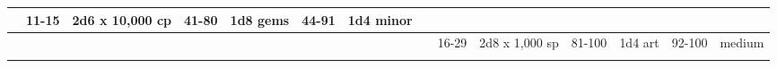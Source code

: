 \begin{longtable}{llllllllllllll}
{\begin{minipage}[t]{1.150in}
\end{minipage}} & \multicolumn{1}{|p{0.393in}|}{\begin{minipage}[t]{0.393in}\raggedright
11-15\end{minipage}} & \multicolumn{1}{p{0.469in}|}{\begin{minipage}[t]{0.469in}\raggedright
2d6 x 10,000 cp\end{minipage}} & \multicolumn{1}{p{0.923in}|}{\begin{minipage}[t]{0.923in}\raggedright
41-80\end{minipage}} & \multicolumn{1}{p{0.469in}|}{\begin{minipage}[t]{0.469in}\raggedright
1d8 gems\end{minipage}} & \multicolumn{1}{p{0.626in}|}{\begin{minipage}[t]{0.626in}\raggedright
44-91\end{minipage}} & \multicolumn{1}{p{0.469in}|}{\begin{minipage}[t]{0.469in}\centering
1d4 minor\end{minipage}}\\
\hline
\multicolumn{8}{p{1.150in}|}{\begin{minipage}[t]{1.150in}\centering
\end{minipage}} & \multicolumn{1}{|p{0.393in}|}{\begin{minipage}[t]{0.393in}\raggedright
16-29\end{minipage}} & \multicolumn{1}{p{0.469in}|}{\begin{minipage}[t]{0.469in}\raggedright
2d8 x 1,000 sp\end{minipage}} & \multicolumn{1}{p{0.923in}|}{\begin{minipage}[t]{0.923in}\raggedright
81-100\end{minipage}} & \multicolumn{1}{p{0.469in}|}{\begin{minipage}[t]{0.469in}\raggedright
1d4 art\end{minipage}} & \multicolumn{1}{p{0.626in}|}{\begin{minipage}[t]{0.626in}\raggedright
92-100\end{minipage}} & \multicolumn{1}{p{0.469in}|}{\begin{minipage}[t]{0.469in}\centering
1 medium\end{minipage}}\\
\hline
\multicolumn{8}{p{1.150in}|}{\begin{minipage}[t]{1.150in}\centering
\end{minipage}} & \multicolumn{1}{|p{0.393in}|}{\begin{minipage}[t]{0.393in}\raggedright

\end{minipage}}
\end{longtable}
